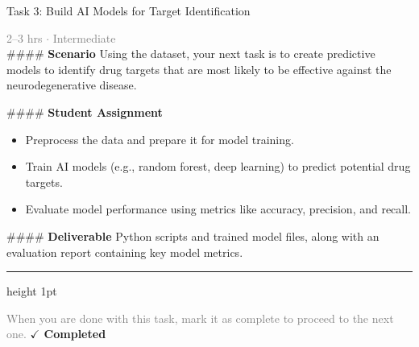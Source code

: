 \documentclass[10pt,a4paper]{article}
\begin{document}
\begin{taskbox}{Task 3: Build AI Models for Target Identification}

    {\small \textcolor{gray}{2--3 hrs $\cdot$ Intermediate}}\\[12pt]

    \#\#\#\# \textbf{Scenario}
Using the dataset, your next task is to create predictive models to identify drug targets that are most likely to be effective against the neurodegenerative disease.

\#\#\#\# \textbf{Student Assignment}
\begin{itemize}
    \item Preprocess the data and prepare it for model training.
    \item Train AI models (e.g., random forest, deep learning) to predict potential drug targets.
    \item Evaluate model performance using metrics like accuracy, precision, and recall.
\end{itemize}

\#\#\#\# \textbf{Deliverable}
Python scripts and trained model files, along with an evaluation report containing key model metrics.\par

    \vspace{16pt}

    \textcolor{cardBorder}{\hrule height 1pt}\vspace{8pt}

    \small \textcolor{gray}{When you are done with this task, mark it as complete to proceed to the next one.} \hfill \textbf{\textcolor{brandDark}{$\checkmark$ Completed}}

\end{taskbox}
\end{document}
